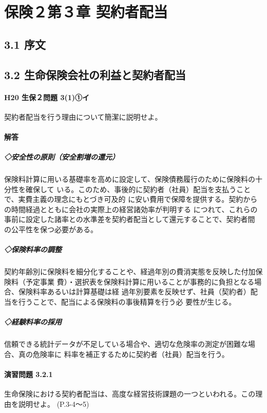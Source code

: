 \documentclass[report,gutter=10mm,fore-edge=10mm,uplatex,dvipdfmx]{jlreq}
\begin{document}
\chapter{保険２第３章 契約者配当}
\section{3.1 序文}
\section{3.2 生命保険会社の利益と契約者配当}
\subsubsection{H20 生保２問題 3(1)①イ}
契約者配当を行う理由について簡潔に説明せよ。
\subsubsection{解答}
\paragraph{◇安全性の原則（安全割増の還元）}
保険料計算に用いる基礎率を高めに設定して、保険債務履行のために保険料の十分性を確保して
いる。このため、事後的に契約者（社員）配当を支払うことで、実費主義の理念にもとづき可及的
に安い費用で保障を提供する。契約からの時間経過とともに会社の実際上の経営諸効率が判明する
につれて、これらの事前に設定した諸率との水準差を契約者配当として還元することで、契約者間
の公平性を保つ必要がある。
\paragraph{◇保険料率の調整}
契約年齢別に保険料を細分化することや、経過年別の費消実態を反映した付加保険料（予定事業
費）・選択表を保険料計算に用いることが事務的に負担となる場合、保険料率あるいは計算基礎は経
過年別要素を反映せず、社員（契約者）配当を行うことで、配当による保険料の事後精算を行う必
要性が生じる。
\paragraph{◇経験料率の採用}
信頼できる統計データが不足している場合や、適切な危険率の測定が困難な場合、真の危険率に
料率を補正するために契約者（社員）配当を行う。

\subsubsection{演習問題 3.2.1}
生命保険における契約者配当は、高度な経営技術課題の一つといわれる。この理由を説明せよ。
(P.3-4〜5)
\end{document}
